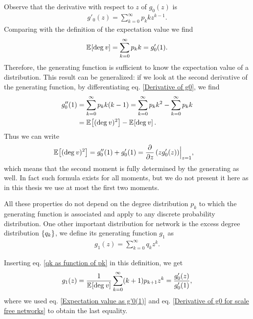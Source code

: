 \documentclass[
11pt, %
english, %
singlespacing, %
nolistspacing, %
liststotoc, %
headsepline, %
]{MastersDoctoralThesis} %
\begin{document}
Observe that the derivative with respect to $z$ of $g_0(z)$ is
\begin{align}
	g'_0(z) = \sum_{k=0}^\infty p_k k z^{k-1}. \label{Derivative of g0}
\end{align}
Comparing with the definition of the expectation value we find
\begin{align}
	\mathbb{E}_{}\!\left[ \mathrm{deg}_{}\, v \right] = \sum_{k=0}^\infty p_k k = g'_0(1). \label{Expectation value as g'0(1)}
\end{align}
Therefore, the generating function is sufficient to know the expectation value of a distribution. This result can be generalized: if we look at the second derivative of the generating function, by differentiating eq. \eqref{Derivative of g0}, we find
\begin{align}
	g''_0(1) &= \sum_{k=0}^\infty p_k k (k - 1) = \sum_{k=0}^\infty p_k k^2 - \sum_{k=0}^\infty p_k k \\
		&= \mathbb{E}_{}\!\left[ (\mathrm{deg}_{}\, v)^2 \right] - \mathbb{E}_{}\!\left[ \mathrm{deg}_{}\, v \right]. \label{Second derivative of g0}
\end{align}
Thus we can write
\begin{align}
	\mathbb{E}_{}\!\left[ (\mathrm{deg}_{}\, v)^2 \right] &= g''_0(1) + g'_0(1) = \frac{\partial}{\partial z}\left(z g'_0(z)\right)\Bigr|_{z = 1},  \label{Second moment as derivatives of g0}
\end{align}
which means that the second moment is fully determined by the generating as well. In fact such formula exists for all moments, but we do not present it here as in this thesis we use at most the first two moments.

All these properties do not depend on the degree distribution $p_k$ to which the generating function is associated and apply to any discrete probability distribution. One other important distribution for network is the excess degree distribution $\{q_k\}$, we define its generating function $g_1$ as
\begin{align}
	g_1(z) = \sum_{k=0}^\infty q_k z^k. \label{Definition of g1}
\end{align}

Inserting eq. \eqref{qk as function of pk} in this definition, we get
\begin{align}
	g_1(z) = \frac{1}{\mathbb{E}_{}\!\left[ \mathrm{deg}_{}\, v \right]} \sum_{k=0}^\infty (k + 1) p_{k + 1} z^k = \frac{g'_0(z)}{g'_0(1)}, \label{g1 as a function of g0}
\end{align}
where we used eq. \eqref{Expectation value as g'0(1)} and eq. \eqref{Derivative of g0 for scale free networks}  to obtain the last equality.
\end{document}
